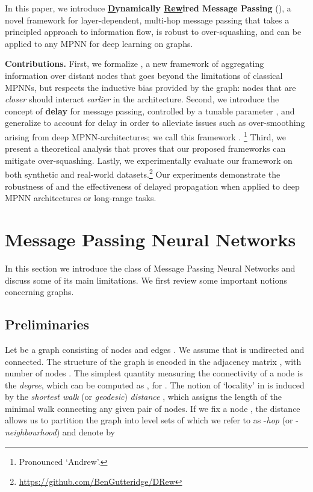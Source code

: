 \documentclass{article}
\theoremstyle{plain}
\theoremstyle{definition}
\theoremstyle{remark}
\begin{document}
In this paper, we introduce \textbf{\underline{D}ynamically \underline{Rew}ired Message Passing} (), a novel framework for layer-dependent, multi-hop message passing that takes a principled approach to information flow, is robust to over-squashing, and can be applied to any MPNN for deep learning on graphs.

{\bf Contributions.} First, we formalize , a new framework  of aggregating information over distant nodes that goes beyond the limitations of classical MPNNs, but respects the inductive bias provided by the graph: nodes that are {\em closer} should interact {\em earlier} in the architecture.  Second, we introduce the concept of \textbf{delay} for message passing, controlled by a tunable parameter , and
generalize  to
account for delay in order to alleviate issues such as over-smoothing arising from deep MPNN-architectures; we call this framework .
\footnote{Pronounced `Andrew'.}
Third, we present a theoretical analysis that proves that our proposed frameworks can mitigate over-squashing. Lastly, we experimentally evaluate our framework
on both synthetic and real-world datasets.\footnote{\url{https://github.com/BenGutteridge/DRew}} Our experiments demonstrate the robustness of  and the effectiveness of delayed propagation when applied to deep MPNN architectures or long-range tasks.




\section{Message Passing Neural Networks}\label{sec:mpnn}

In this section we introduce the class of Message Passing Neural Networks and discuss some of its main limitations.
We first review some important notions concerning graphs.
\subsection{Preliminaries}
Let  be a graph consisting of nodes  and edges . We assume that  is undirected and connected. The structure of the graph is encoded in the adjacency matrix , with number of nodes . The simplest quantity measuring the connectivity of a node is the {\em degree}, which can be computed as , for . The notion of `locality' in  is induced by the {\em shortest walk} (or {\em geodesic}) {\em distance} , which assigns the length of the minimal walk connecting any given pair of nodes. If we fix a node , the distance allows us to partition the graph into level sets of  which we refer to as -{\em hop} (or -{\em neighbourhood}) and denote by
\end{document}
